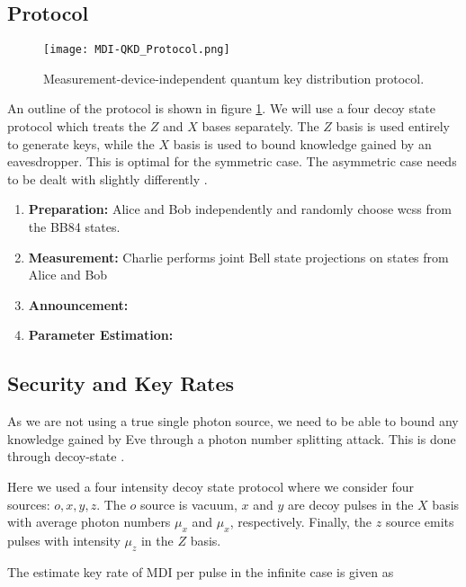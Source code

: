 \subsection{Protocol}

\begin{figure}[tbp]
	\centering
	\texttt{[image: MDI-QKD\_Protocol.png]}
	\caption[MDI-QKD protocol]{Measurement-device-independent quantum key distribution protocol.}
	\label{fig:mdi_protocol}
\end{figure}

An outline of the protocol is shown in figure \ref{fig:mdi_protocol}. We will use a four decoy state protocol \cite{zhou2016} which treats the $Z$ and $X$ bases separately. The $Z$ basis is used entirely to generate keys, while the $X$ basis is used to bound knowledge gained by an eavesdropper. This is optimal for the symmetric case. The asymmetric case needs to be dealt with slightly differently \cite{wang2018}.

\begin{enumerate}
	\item \textbf{Preparation:} Alice and Bob independently and randomly choose \acp{wcs} from the BB84 states. 
	\item \textbf{Measurement:} Charlie performs joint Bell state projections on states from Alice and Bob
	\item \textbf{Announcement:}
	\item \textbf{Parameter Estimation:}
\end{enumerate}

\subsection{Security and Key Rates}

As we are not using a true single photon source, we need to be able to bound any knowledge gained by Eve through a photon number splitting attack. This is done through decoy-state \cite{}. 

Here we used a four intensity decoy state protocol where we consider four sources: $o, x, y, z$. The $o$ source is vacuum, $x$ and $y$ are decoy pulses in the $X$ basis with average photon numbers $\mu_x$ and $\mu_x$, respectively. Finally, the $z$ source emits pulses with intensity $\mu_z$ in the $Z$ basis. 

The estimate key rate of \ac{MDI} per pulse in the infinite case is given as

